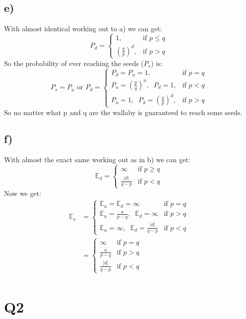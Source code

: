 \documentclass{article}
\begin{document}
\subsection*{e)}
With almost identical working out to a) we can get:
$$P_d=\begin{cases}
1, & \text{if }p\leq q\\
(\frac{q}{p})^d, & \text{if }p>q
\end{cases}$$
So the probability of ever reaching the seeds ($P_s$) is:
$$P_s=P_u \text{ or } P_d=\begin{cases}
P_d=P_u=1, & \text{if }p= q\\
P_u=(\frac{p}{q})^u,\;\;P_d=1, & \text{if }p<q\\
P_u=1,\;\;P_d=(\frac{q}{p})^d, & \text{if }p>q
\end{cases}$$
So no matter what p and q are the wallaby is guaranteed to reach some seeds.
\subsection*{f)}
With almost the exact same working out as in b) we can get:
$$\mathbb{E}_d=\begin{cases}
\infty & \text{if } p\geq q\\
\frac{|d|}{q-p} & \text{if } p<q
\end{cases}$$
Now we get:
\begin{align*}
\mathbb{E}_s&=\begin{cases}
\mathbb{E}_u=\mathbb{E}_d=\infty & \text{if } p=q\\
\mathbb{E}_u=\frac{u}{p-q},\;\;\mathbb{E}_d=\infty & \text{if } p>q\\
\mathbb{E}_u=\infty,\;\;\mathbb{E}_d=\frac{|d|}{q-p} & \text{if } p<q
\end{cases}\\
&=\begin{cases}
\infty & \text{if } p=q\\
\frac{u}{p-q} & \text{if } p>q\\
\frac{|d|}{q-p} & \text{if } p<q
\end{cases}\\
\end{align*}
\section*{Q2}
\end{document}
